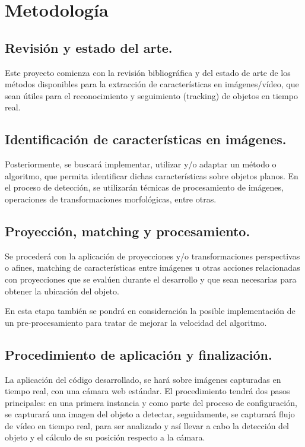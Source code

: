 \documentclass[a4paper,11pt,spanish]{article}
\begin{document}
\section{Metodología}
\subsection{Revisión y estado del arte.}
Este proyecto comienza con la revisión bibliográfica y del estado de arte de los métodos disponibles para la extracción de características en imágenes/vídeo, 
que sean útiles para el reconocimiento y seguimiento (tracking) de objetos en tiempo real.

\subsection{Identificación de características en imágenes.}
Posteriormente, se buscará implementar, utilizar y/o adaptar un método o algoritmo, que permita identificar dichas 
características sobre objetos planos. En el proceso de detección, se utilizarán técnicas de procesamiento de imágenes, operaciones 
de transformaciones morfológicas, entre otras.
  
\subsection {Proyección, matching y procesamiento.}
Se procederá con la aplicación de proyecciones y/o transformaciones perspectivas o afines, matching de características entre imágenes u 
otras acciones relacionadas con proyecciones que se evalúen durante el desarrollo y que sean necesarias para obtener la ubicación del objeto.

En esta etapa también se pondrá en consideración la posible implementación de un pre-procesamiento para tratar de mejorar la velocidad del algoritmo.

\subsection {Procedimiento de aplicación y finalización.}
La aplicación del código desarrollado, se hará sobre imágenes capturadas en tiempo real, con una cámara web estándar. El procedimiento tendrá dos pasos principales: en una
primera instancia y como parte del proceso de configuración, se capturará una imagen del objeto a detectar, seguidamente, se capturará flujo de vídeo en tiempo real, 
para ser analizado y así llevar a cabo la detección del objeto y el cálculo de su posición respecto a la cámara.
\end{document}
